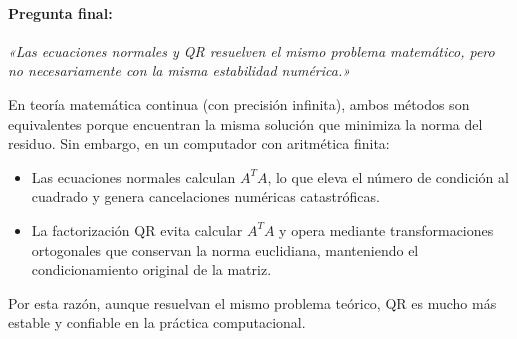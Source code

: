 \documentclass[11pt,a4paper]{article}
\begin{document}
\paragraph{Pregunta final:}
\textit{«Las ecuaciones normales y QR resuelven el mismo problema matemático, pero no necesariamente con la misma estabilidad numérica.»}

\medskip
En teoría matemática continua (con precisión infinita), ambos métodos son equivalentes porque encuentran la misma solución que minimiza la norma del residuo. Sin embargo, en un computador con aritmética finita:
\begin{itemize}[leftmargin=*]
    \item Las ecuaciones normales calculan $A^T A$, lo que eleva el número de condición al cuadrado y genera cancelaciones numéricas catastróficas.
    \item La factorización QR evita calcular $A^T A$ y opera mediante transformaciones ortogonales que conservan la norma euclidiana, manteniendo el condicionamiento original de la matriz.
\end{itemize}
Por esta razón, aunque resuelvan el mismo problema teórico, QR es mucho más estable y confiable en la práctica computacional.
\end{document}
